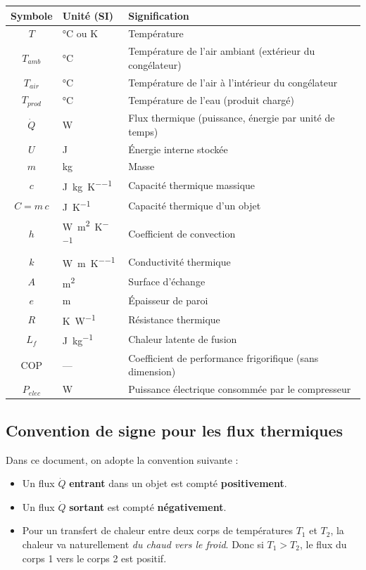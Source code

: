 \documentclass[11pt,a4paper]{article}
\begin{document}
\begin{center}
\begin{tabular}{cll}
\toprule
\textbf{Symbole} & \textbf{Unité (SI)} & \textbf{Signification} \\
\midrule
$T$ & \si{\celsius} ou \si{\kelvin} & Température \\
$T_{amb}$ & \si{\celsius} & Température de l'air ambiant (extérieur du congélateur) \\
$T_{air}$ & \si{\celsius} & Température de l'air à l'intérieur du congélateur \\
$T_{prod}$ & \si{\celsius} & Température de l'eau (produit chargé) \\
$\dot Q$ & \si{\watt} & Flux thermique (puissance, énergie par unité de temps) \\
$U$ & \si{\joule} & Énergie interne stockée \\
$m$ & \si{\kilogram} & Masse \\
$c$ & \si{\joule\per\kilogram\per\kelvin} & Capacité thermique massique \\
$C = m\,c$ & \si{\joule\per\kelvin} & Capacité thermique d'un objet \\
$h$ & \si{\watt\per\meter\squared\per\kelvin} & Coefficient de convection \\
$k$ & \si{\watt\per\meter\per\kelvin} & Conductivité thermique \\
$A$ & \si{\meter\squared} & Surface d'échange \\
$e$ & \si{\meter} & Épaisseur de paroi \\
$R$ & \si{\kelvin\per\watt} & Résistance thermique \\
$L_f$ & \si{\joule\per\kilogram} & Chaleur latente de fusion \\
COP & --- & Coefficient de performance frigorifique (sans dimension) \\
$P_{elec}$ & \si{\watt} & Puissance électrique consommée par le compresseur \\
\bottomrule
\end{tabular}
\end{center}

\subsection{Convention de signe pour les flux thermiques}

Dans ce document, on adopte la convention suivante :
\begin{itemize}[itemsep=0pt]
\item Un flux $\dot Q$ \textbf{entrant} dans un objet est compté \textbf{positivement}.
\item Un flux $\dot Q$ \textbf{sortant} est compté \textbf{négativement}.
\item Pour un transfert de chaleur entre deux corps de températures $T_1$ et $T_2$, la
chaleur va naturellement \emph{du chaud vers le froid}. Donc si $T_1 > T_2$, le flux du
corps 1 vers le corps 2 est positif.
\end{itemize}
\end{document}
